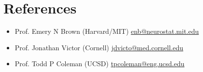 \section*{References}

\begin{itemize}

    \item Prof. Emery N Brown (Harvard/MIT) \href{mailto:enb@neurostat.mit.edu}{enb@neurostat.mit.edu}


    
    \item Prof. Jonathan Victor (Cornell) \href{mailto:jdvicto@med.cornell.edu}{jdvicto@med.cornell.edu}


    \item Prof. Todd P Coleman (UCSD) \href{mailto:tpcoleman@eng.ucsd.edu}{tpcoleman@eng.ucsd.edu}
    
\end{itemize}
